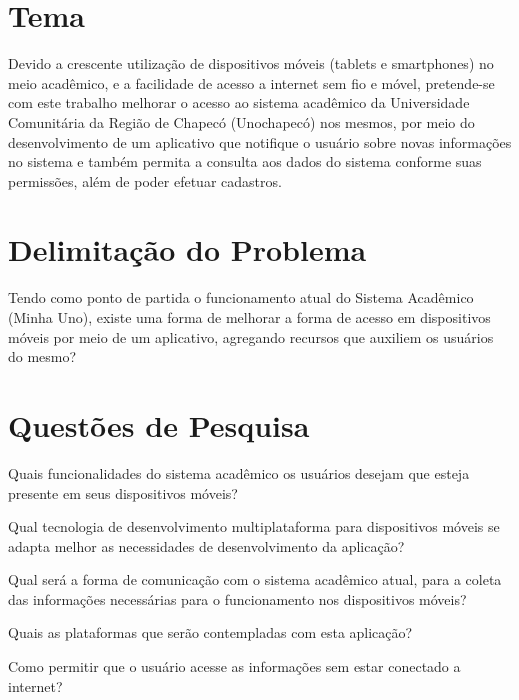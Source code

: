 \section{Tema}
Devido a crescente utilização de dispositivos móveis (tablets e smartphones) no meio acadêmico, e a facilidade de acesso a internet sem fio e móvel, pretende-se com este trabalho melhorar o acesso ao sistema acadêmico da Universidade Comunitária da Região de Chapecó (Unochapecó) nos mesmos, por meio do desenvolvimento de um aplicativo que notifique o usuário sobre novas informações no sistema e também permita a consulta aos dados do sistema conforme suas permissões, além de poder efetuar cadastros.

\section{Delimitação do Problema}
Tendo como ponto de partida o funcionamento atual do Sistema Acadêmico (Minha Uno), existe uma forma de melhorar a forma de acesso em dispositivos móveis por meio de um aplicativo, agregando recursos que auxiliem os usuários do mesmo?

\section{Questões de Pesquisa}
Quais funcionalidades do sistema acadêmico os usuários desejam que esteja presente em seus dispositivos móveis? 

Qual tecnologia de desenvolvimento multiplataforma para dispositivos móveis se adapta melhor as necessidades de desenvolvimento da aplicação? 

Qual será a forma de comunicação com o sistema acadêmico atual, para a coleta das informações necessárias para o funcionamento nos dispositivos móveis?

Quais as plataformas que serão contempladas com esta aplicação? 

Como permitir que o usuário acesse as informações sem estar conectado a internet?